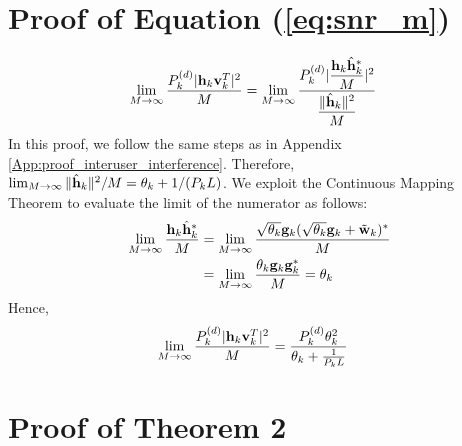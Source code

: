 \documentclass[draftclsnofoot, 12pt, onecolumn, journal]{IEEEtran}
\newcommand{\gv}{{\bf g}}
\newcommand{\hv}{{\bf h}}
\newcommand{\wv}{{\bf w}}
\newcommand{\vv}{{\bf v}}
\begin{document}
\section{Proof of Equation (\ref{eq:snr_m})}
\label{App:proof_numerator}
%
\begin{align}
\lim_{M \rightarrow \infty} \frac{ P_k^{(d)} \vert \hv_k \vv_k^T \vert^2} {M} &= \lim_{M \rightarrow \infty} \frac{ P_k^{(d)} \vert \dfrac{\hv_k \hat{\hv}_k^* }{M} \vert^2} { \dfrac{\Vert \hat{\hv}_k \Vert^2}{M}}
\end{align}
%
In this proof, we follow the same steps as in Appendix \ref{App:proof_interuser_interference}.
Therefore, $\lim_{M \rightarrow \infty} \Vert \hat{\hv}_k \Vert^2 / M = \theta_k + 1 / (P_k L)$.
We exploit the Continuous Mapping Theorem to evaluate the limit of the numerator as follows:
%
\begin{align}
\lim_{M \rightarrow \infty} \dfrac{ \hv_k \hat{\hv}_k^* }{M} &= \lim_{M \rightarrow \infty} \dfrac{ \sqrt{\theta_k} \gv_k ( \sqrt{\theta_k} \gv_k + \tilde{\wv}_k )^* }{M} \\
&= \lim_{M \rightarrow \infty} \dfrac{ \theta_k \gv_k \gv_k^* }{M} = \theta_k
\end{align}
%
Hence,
%
\begin{align}
\lim_{M \rightarrow \infty} \frac{ P_k^{(d)} \vert \hv_k \vv_k^T \vert^2} {M} &= \frac{ P_k^{(d)} \theta_k^2} { \theta_k + \frac{1}{P_k L}} 
\end{align}
%


\section{Proof of Theorem 2}
\label{App:A}
\end{document}
